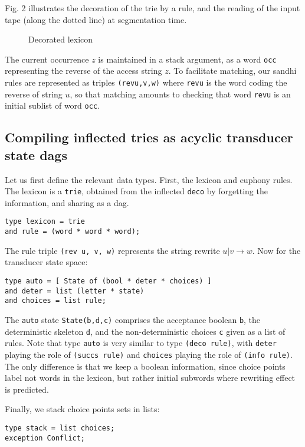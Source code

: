 Fig. 2 illustrates the decoration of the trie by a rule,
and the reading of the input tape (along the dotted line) at segmentation time.
\begin{figure}[htb]
\begin{center}
\end{center}
\label{fig2}
\caption{Decorated lexicon}
\end{figure}

The current occurrence $z$ is maintained in a stack argument, as a word
\verb:occ: representing the reverse of the access string $z$. 
To facilitate matching, our sandhi rules are represented as triples 
\verb:(revu,v,w): where \verb:revu: is the word coding the reverse 
of string $u$, 
so that matching amounts to checking that word \verb:revu: is an initial 
sublist of word \verb:occ:. 

\subsection{Compiling inflected tries as acyclic transducer state dags}

Let us first define the relevant data types. First, the lexicon and
euphony rules. The lexicon is a \verb:trie:, obtained from the 
inflected \verb:deco: by forgetting the information, and sharing as a dag.

\begin{verbatim}
type lexicon = trie
and rule = (word * word * word);
\end{verbatim}
The rule triple \verb:(rev u, v, w): represents the string rewrite 
$u|v\rightarrow w$. Now for the transducer state space:
\begin{verbatim}
type auto = [ State of (bool * deter * choices) ]
and deter = list (letter * state)
and choices = list rule;
\end{verbatim}
The \verb:auto: state \verb:State(b,d,c): comprises the acceptance boolean 
\verb:b:, the deterministic skeleton \verb:d:, and the non-deterministic 
choices \verb:c: given as a list of rules. 
Note that type \verb:auto: is very similar to 
type \verb:(deco rule):, with \verb:deter: playing the role of 
\verb:(succs rule): and \verb:choices: playing the role of 
\verb:(info rule):. The only difference is that we keep a boolean 
information, since choice points label not words in the lexicon, but rather
initial subwords where rewriting effect is predicted.

Finally, we stack choice points sets in lists:
\begin{verbatim}
type stack = list choices; 
exception Conflict;
\end{verbatim}

